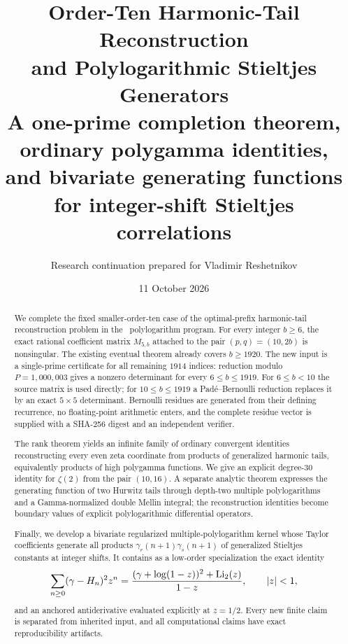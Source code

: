 \documentclass[11pt]{article}
\title{\textbf{Order-Ten Harmonic-Tail Reconstruction\\
and Polylogarithmic Stieltjes Generators}\\[0.4em]
\large A one-prime completion theorem, ordinary polygamma identities,\\
and bivariate generating functions for integer-shift Stieltjes correlations}
\author{Research continuation prepared for Vladimir Reshetnikov}
\date{11 October 2026}
\begin{document}
\maketitle

\begin{abstract}
We complete the fixed smaller-order-ten case of the optimal-prefix
harmonic-tail reconstruction problem in the \Repo\ polylogarithm
program.  For every integer $b\ge6$, the exact rational coefficient
matrix $M_{5,b}$ attached to the pair $(p,q)=(10,2b)$ is nonsingular.
The existing eventual theorem already covers $b\ge1920$.  The new
input is a single-prime certificate for all remaining $1914$ indices:
reduction modulo $P=1{,}000{,}003$ gives a nonzero determinant for
every $6\le b\le1919$.  For $6\le b<10$ the source matrix is used
directly; for $10\le b\le1919$ a Pad\'e--Bernoulli reduction replaces
it by an exact $5\times5$ determinant.  Bernoulli residues are generated
from their defining recurrence, no floating-point arithmetic enters,
and the complete residue vector is supplied with a SHA-256 digest and
an independent verifier.

The rank theorem yields an infinite family of ordinary convergent
identities reconstructing every even zeta coordinate from products of
generalized harmonic tails, equivalently products of high polygamma
functions.  We give an explicit degree-$30$ identity for
$\zeta(2)$ from the pair $(10,16)$.  A separate analytic theorem
expresses the generating function of two Hurwitz tails through depth-two
multiple polylogarithms and a Gamma-normalized double Mellin integral;
the reconstruction identities become boundary values of explicit
polylogarithmic differential operators.

Finally, we develop a bivariate regularized multiple-polylogarithm
kernel whose Taylor coefficients generate all products
$\gamma_r(n+1)\gamma_s(n+1)$ of generalized Stieltjes constants at
integer shifts.  It contains as a low-order specialization the exact
identity
\[
 \sum_{n\ge0}(\gamma-H_n)^2z^n
 =\frac{(\gamma+\log(1-z))^2+\operatorname{Li}_2(z)}{1-z},
 \qquad |z|<1,
\]
and an anchored antiderivative evaluated explicitly at $z=1/2$.
Every new finite claim is separated from inherited input, and all
computational claims have exact reproducibility artifacts.
\end{abstract}

\tableofcontents
\newpage










\appendix




\end{document}
